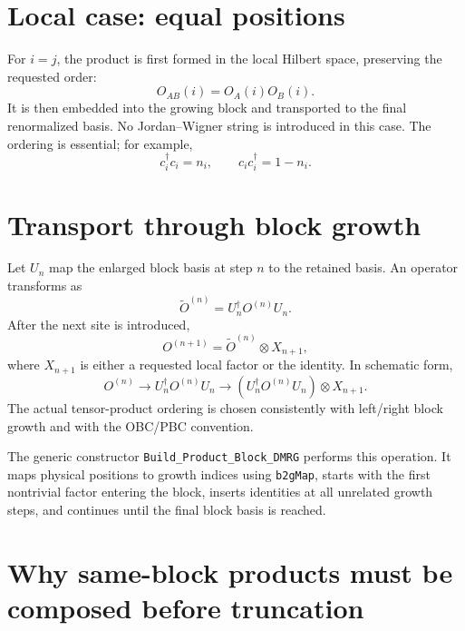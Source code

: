 \documentclass[11pt,a4paper]{article}
\begin{document}
\section{Local case: equal positions}

For $i=j$, the product is first formed in the local Hilbert space, preserving
the requested order:
\begin{equation}
  O_{AB}(i)=O_A(i)O_B(i).
\end{equation}
It is then embedded into the growing block and transported to the final
renormalized basis.  No Jordan--Wigner string is introduced in this case.
The ordering is essential; for example,
\begin{equation}
  c_i^\dagger c_i=n_i,
  \qquad
  c_ic_i^\dagger=1-n_i.
\end{equation}

\section{Transport through block growth}

Let $U_n$ map the enlarged block basis at step $n$ to the retained basis.
An operator transforms as
\begin{equation}
  \widetilde O^{(n)}=U_n^\dagger O^{(n)}U_n.
\end{equation}
After the next site is introduced,
\begin{equation}
  O^{(n+1)}
  =\widetilde O^{(n)}\otimes X_{n+1},
\end{equation}
where $X_{n+1}$ is either a requested local factor or the identity.  In
schematic form,
\begin{equation}
  O^{(n)}
  \longrightarrow U_n^\dagger O^{(n)}U_n
  \longrightarrow
  \left(U_n^\dagger O^{(n)}U_n\right)\otimes X_{n+1}.
\end{equation}
The actual tensor-product ordering is chosen consistently with left/right
block growth and with the OBC/PBC convention.

The generic constructor \texttt{Build\_Product\_Block\_DMRG} performs this
operation.  It maps physical positions to growth indices using
\texttt{b2gMap}, starts with the first nontrivial factor entering the block,
inserts identities at all unrelated growth steps, and continues until the
final block basis is reached.

\section{Why same-block products must be composed before truncation}
\end{document}
